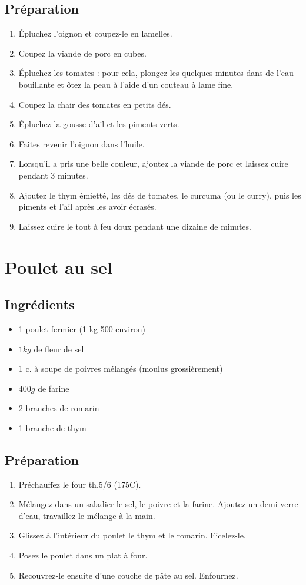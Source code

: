 \subsection*{Préparation}
\begin{enumerate}
\item Épluchez l'oignon et coupez-le en lamelles.
\item Coupez la viande de porc en cubes.
\item Épluchez les tomates : pour cela, plongez-les quelques minutes dans de l'eau bouillante et ôtez la peau à l'aide d'un couteau à lame fine.
\item Coupez la chair des tomates en petits dés.
\item Épluchez la gousse d'ail et les piments verts.
\item Faites revenir l'oignon dans l'huile.
\item Lorsqu'il a pris une belle couleur, ajoutez la viande de porc et laissez cuire pendant 3 minutes.
\item Ajoutez le thym émietté, les dés de tomates, le curcuma (ou le curry), puis les piments et l'ail après les avoir écrasés.
\item Laissez cuire le tout à feu doux pendant une dizaine de minutes.
\end{enumerate}

\newpage
\section{Poulet au sel}
\subsection*{Ingrédients}
\begin{itemize}
\item 1 poulet fermier (1 kg 500 environ)
\item $1\unit{kg}$ de fleur de sel
\item 1 c. à soupe de poivres mélangés (moulus grossièrement)
\item $400\unit{g}$ de farine
\item 2 branches de romarin
\item 1 branche de thym
\end{itemize}


\subsection*{Préparation}
\begin{enumerate}
\item Préchauffez le four th.5/6 (175\degres C).
\item Mélangez dans un saladier le sel, le poivre et la farine. Ajoutez un demi verre d'eau, travaillez le mélange à la main.
\item Glissez à l'intérieur du poulet le thym et le romarin. Ficelez-le.
\item Posez le poulet dans un plat à four.
\item Recouvrez-le ensuite d'une couche de pâte au sel. Enfournez.
\end{enumerate}

